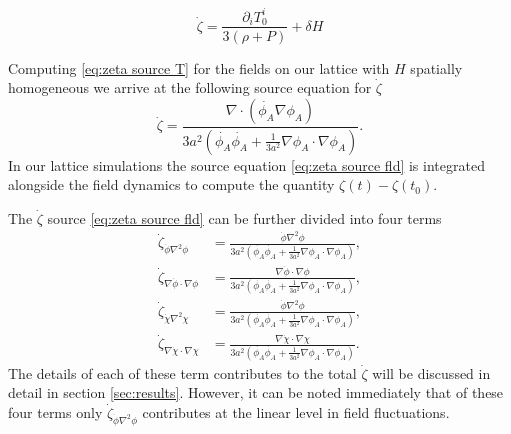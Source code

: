 \begin{equation} \label{eq:zeta source T}
  \dot{\zeta} = \frac{\partial_iT^i_0}{3(\rho+P)} + \delta H %
\end{equation} 

Computing \eqref{eq:zeta source T} for the fields on our lattice with $H$ spatially homogeneous we arrive at the following source equation for $\dot{\zeta}$
\begin{equation} \label{eq:zeta source fld}
  \dot{\zeta} = \frac{\nabla\cdot(\dot{\phi_A}\nabla\phi_A)}{3a^2(\dot{\phi_A}\dot{\phi_A} +\frac{1}{3a^2}\nabla\phi_A\cdot\nabla\phi_A)}.
\end{equation} 
In our lattice simulations the source equation \eqref{eq:zeta source fld} is integrated alongside the field dynamics to compute the quantity $\zeta(t) - \zeta(t_0)$. 

The $\dot{\zeta}$ source \eqref{eq:zeta source fld} can be further divided into four terms
\begin{align}
  \dot{\zeta}_{\dot{\phi}\nabla^2\phi} & = \frac{\dot{\phi}\nabla^2\phi}{3a^2(\dot{\phi_A}\dot{\phi_A} +\frac{1}{3a^2}\nabla\phi_A\cdot\nabla\phi_A)}, \\
  \dot{\zeta}_{\nabla\dot{\phi}\cdot\nabla\phi} & = \frac{\nabla\dot{\phi}\cdot\nabla\phi}{3a^2(\dot{\phi_A}\dot{\phi_A} +\frac{1}{3a^2}\nabla\phi_A\cdot\nabla\phi_A)}, \\
  \dot{\zeta}_{\dot{\chi}\nabla^2\chi} & = \frac{\dot{\phi}\nabla^2\phi}{3a^2(\dot{\phi_A}\dot{\phi_A} +\frac{1}{3a^2}\nabla\phi_A\cdot\nabla\phi_A)}, \\
  \dot{\zeta}_{\nabla\dot{\chi}\cdot\nabla\chi} & = \frac{\nabla\dot{\chi}\cdot\nabla\chi}{3a^2(\dot{\phi_A}\dot{\phi_A} +\frac{1}{3a^2}\nabla\phi_A\cdot\nabla\phi_A)}.
\end{align}
The details of each of these term contributes to the total $\dot{\zeta}$ will be discussed in detail in section \ref{sec:results}.
However, it can be noted immediately that of these four terms only $\dot{\zeta}_{\dot{\phi}\nabla^2\phi}$ contributes at the linear level in field fluctuations. %

